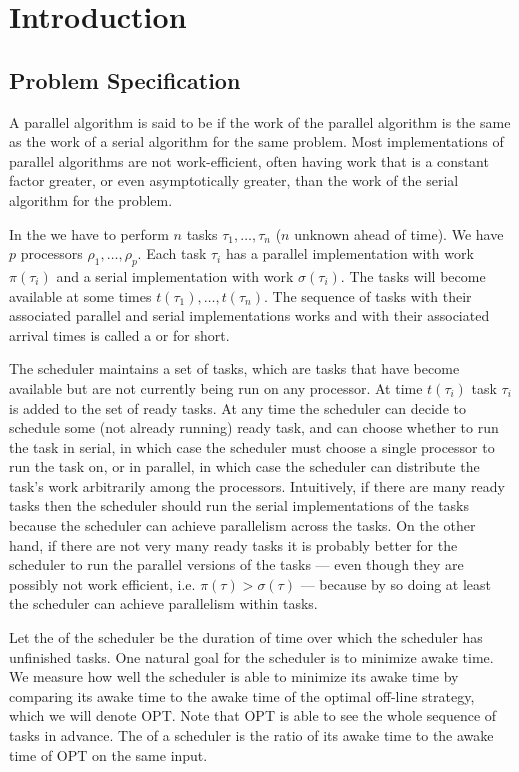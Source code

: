 \section{Introduction}
\subsection{Problem Specification}
A parallel algorithm is said to be  if the
work of the parallel algorithm is the same as the work of a
serial algorithm for the same problem. Most implementations of
parallel algorithms are not work-efficient, often having work
that is a constant factor greater, or even asymptotically
greater, than the work of the serial algorithm for the problem.

In the  we have to
perform $n$ tasks $\tau_1, \ldots, \tau_n$ ($n$ unknown ahead of
time). We have $p$ processors $\rho_1, \ldots, \rho_p$. Each task
$\tau_i$ has a parallel implementation with work $\pi(\tau_i)$ and a
serial implementation with work $\sigma(\tau_i)$. The tasks will become
available at some times $t(\tau_1), \ldots, t(\tau_n)$. 
The sequence of tasks with their associated parallel and serial
implementations works and with their associated arrival times is
called a  or  for short.

The scheduler maintains a set of  tasks, which are
tasks that have become available but are not currently being run
on any processor. At time $t(\tau_i)$ task $\tau_i$ is added to
the set of ready tasks. At any time the scheduler can decide to
schedule some (not already running) ready task, and can choose
whether to run the task in serial, in which case the scheduler
must choose a single processor to run the task on, or in
parallel, in which case the scheduler can distribute the task's
work arbitrarily among the processors. Intuitively, if there are
many ready tasks then the scheduler should run the serial
implementations of the tasks because the scheduler can achieve
parallelism across the tasks. On the other hand, if there are not
very many ready tasks it is probably better for the scheduler to
run the parallel versions of the tasks --- even though they are
possibly not work efficient, i.e. $\pi(\tau) > \sigma(\tau)$ ---
because by so doing at least the scheduler can achieve
parallelism within tasks.

Let the  of the scheduler be the duration of
time over which the scheduler has unfinished tasks. One natural
goal for the scheduler is to minimize awake time. We measure how
well the scheduler is able to minimize its awake time by
comparing its awake time to the awake time of the optimal
off-line strategy, which we will denote OPT. Note that OPT is
able to see the whole sequence of tasks in advance. The
 of a scheduler is the ratio of its awake
time to the awake time of OPT on the same input.

